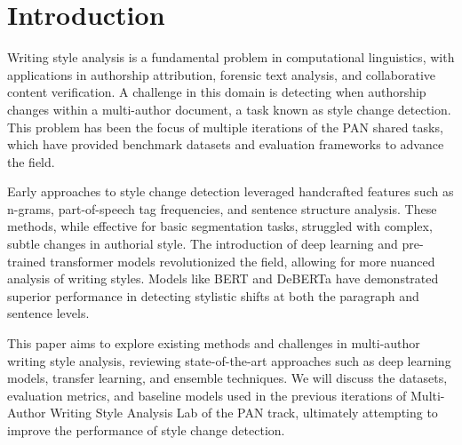 \section{Introduction}

Writing style analysis is a fundamental problem in computational linguistics, with applications in authorship attribution, forensic text analysis, and collaborative content verification. A challenge in this domain is detecting when authorship changes within a multi-author document, a task known as style change detection. This problem has been the focus of multiple iterations of the PAN shared tasks, which have provided benchmark datasets and evaluation frameworks to advance the field.

Early approaches to style change detection leveraged handcrafted features such as n-grams, part-of-speech tag frequencies, and sentence structure analysis. These methods, while effective for basic segmentation tasks, struggled with complex, subtle changes in authorial style. The introduction of deep learning and pre-trained transformer models revolutionized the field, allowing for more nuanced analysis of writing styles. Models like BERT and DeBERTa have demonstrated superior performance in detecting stylistic shifts at both the paragraph and sentence levels.

This paper aims to explore existing methods and challenges in multi-author writing style analysis, reviewing state-of-the-art approaches such as deep learning models, transfer learning, and ensemble techniques. We will discuss the datasets, evaluation metrics, and baseline models used in the previous iterations of Multi-Author Writing Style Analysis Lab of the PAN track, ultimately attempting to improve the performance of style change detection.